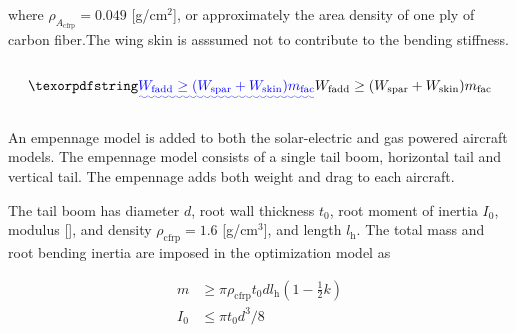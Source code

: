 where $\rho_{A_{\text{cfrp}}} = 0.049$ [g/cm$^2$], or approximately the area density of one ply of carbon fiber.\DIFdelbegin {}\DIFdelend \DIFaddbegin {}\DIFaddend The wing skin is asssumed not to contribute to the bending stiffness. 

\DIFdelbegin \subsection{}
\addtocounter{subsection}{-1}%
\DIFdelend \DIFaddbegin {}\DIFaddend 

\DIFaddbegin \begin{equation}
    \DIFadd{W_{\text{fadd}} \geq (W_{\text{spar}} + W_{\text{skin}}) m_{\text{fac}}
}\end{equation}



\subsubsection{}

\DIFaddend An empennage model is added to both the solar-electric and gas powered aircraft models.  The empennage model consists of a single tail boom, horizontal tail and vertical tail.  
The empennage adds both weight and drag to each aircraft.  

The tail boom has \DIFdelbegin {}\DIFdelend \DIFaddbegin {}\DIFaddend diameter $d$, root wall thickness $t_0$, root moment of inertia $I_0$, modulus \DIFdelbegin {}\DIFdelend \DIFaddbegin {}[]\DIFaddend , and density $\rho_{\text{cfrp}} = 1.6$ [g/cm$^3$]\DIFaddbegin {}\DIFaddend , and length $l_{\text{h}}$. 
The total mass and root bending inertia are imposed in the optimization model as 

\begin{align}
    m &\geq \pi \rho_{\text{cfrp}} t_0 d l_{\text{h}} \left( 1 - \frac{1}{2} k\right) \\
    I_0 &\leq \pi t_0 d^3/8
\end{align}


